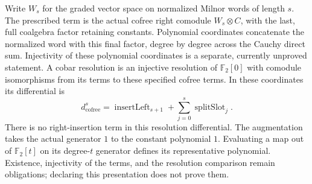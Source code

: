 \begin{definition}
  \label{def:milnor-cofree-resolution}
  Write $W_s$ for the graded vector space on normalized Milnor words of
  length $s$. The prescribed term is the actual cofree right comodule
  $W_s\otimes C$, with the last, full coalgebra factor retaining constants.
  Polynomial coordinates concatenate the normalized word with this final
  factor, degree by degree across the Cauchy direct sum.
  Injectivity of these polynomial coordinates is a separate, currently
  unproved statement.
  A cobar resolution is an injective resolution of $\mathbb F_2[0]$ with
  comodule isomorphisms from its terms to these specified cofree terms.
  In these coordinates its differential is
  \[
    d_{\mathrm{cofree}}^s=\operatorname{insertLeft}_{s+1}
       +\sum_{j=0}^{s}\operatorname{splitSlot}_j.
  \]
  There is no right-insertion term in this resolution differential.
  The augmentation takes the actual generator $1$ to the constant
  polynomial $1$. Evaluating a map out of $\mathbb F_2[t]$ on its
  degree-$t$ generator defines its representative polynomial.
  Existence, injectivity of the terms, and the resolution comparison
  remain obligations; declaring this presentation does not prove them.
\end{definition}

